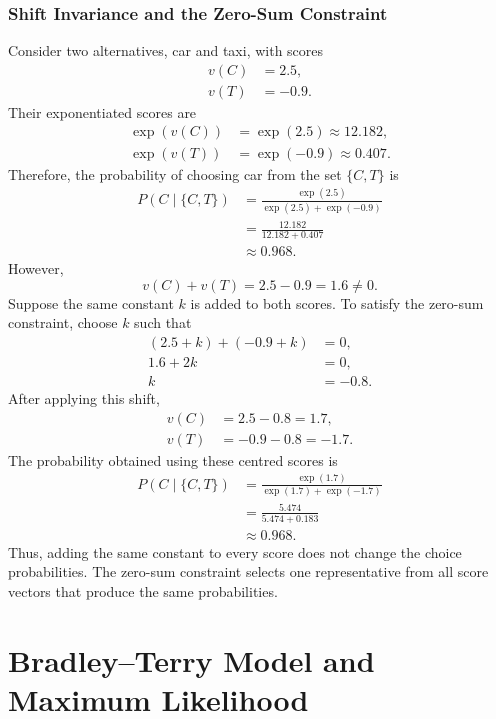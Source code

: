 \documentclass[12pt,oneside]{report}
\begin{document}
\subsection{Shift Invariance and the Zero-Sum Constraint}
Consider two alternatives, car and taxi, with scores
\begin{align*}
    v(C)&=2.5,\\
    v(T)&=-0.9.
\end{align*}
Their exponentiated scores are
\begin{align*}
    \exp(v(C))
    &=
    \exp(2.5)
    \approx
    12.182,
    \\
    \exp(v(T))
    &=
    \exp(-0.9)
    \approx
    0.407.
\end{align*}
Therefore, the probability of choosing car from the set
\(\{C,T\}\) is
\begin{align*}
    P(C\mid\{C,T\})
    &=
    \frac{\exp(2.5)}
    {\exp(2.5)+\exp(-0.9)}
    \\
    &=
    \frac{12.182}{12.182+0.407}
    \\
    &\approx
    0.968.
\end{align*}
However,
\begin{equation}
    v(C)+v(T)=2.5-0.9=1.6\neq 0.
\end{equation}
Suppose the same constant \(k\) is added to both scores. To satisfy the
zero-sum constraint, choose \(k\) such that
\begin{align*}
    (2.5+k)+(-0.9+k)&=0,\\
    1.6+2k&=0,\\
    k&=-0.8.
\end{align*}
After applying this shift,
\begin{align*}
    v(C)&=2.5-0.8=1.7,\\
    v(T)&=-0.9-0.8=-1.7.
\end{align*}
The probability obtained using these centred scores is
\begin{align*}
    P(C\mid\{C,T\})
    &=
    \frac{\exp(1.7)}
    {\exp(1.7)+\exp(-1.7)}
    \\
    &=
    \frac{5.474}{5.474+0.183}
    \\
    &\approx
    0.968.
\end{align*}
Thus, adding the same constant to every score does not change the choice
probabilities. The zero-sum constraint selects one representative from all
score vectors that produce the same probabilities.
\chapter{Bradley--Terry Model and Maximum Likelihood}
\end{document}

